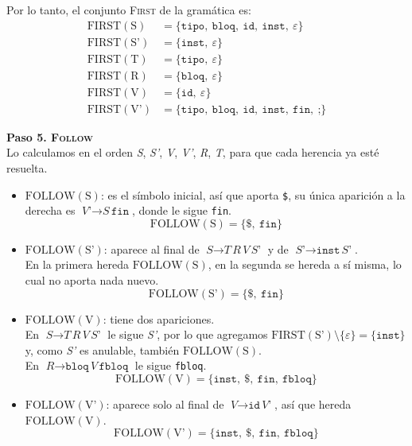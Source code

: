 \documentclass[12pt,letterpaper]{article}
\newcommand{\nt}[1]{\textit{#1}}
\newcommand{\tk}[1]{\texttt{#1}}
\newcommand{\tx}[1]{\text{#1}}
\newcommand{\First}[1]{\mathrm{FIRST}(#1)}
\newcommand{\Follow}[1]{\mathrm{FOLLOW}(#1)}
\newcommand{\eps}{\varepsilon}
\begin{document}
\begin{enumerate}[label=\arabic*.]
\begin{itemize}
    Por lo tanto, el conjunto \textsc{First} de la gramática es:
    \[
    \begin{aligned}
      \First{\tx{S}}  &= \{\tk{tipo},\ \tk{bloq},\ \tk{id},\ \tk{inst},\ \eps\} \\
      \First{\tx{S'}} &= \{\tk{inst},\ \eps\} \\
      \First{\tx{T}}  &= \{\tk{tipo},\ \eps\} \\
      \First{\tx{R}}  &= \{\tk{bloq},\ \eps\} \\
      \First{\tx{V}}  &= \{\tk{id},\ \eps\} \\
      \First{\tx{V'}} &= \{\tk{tipo},\ \tk{bloq},\ \tk{id},\ \tk{inst},\ \tk{fin},\ \tk{;}\}
    \end{aligned}
    \]

    \bigskip

    \textbf{Paso 5. \textsc{Follow}}\\
    Lo calculamos en el orden \nt{S}, \nt{S'}, \nt{V}, \nt{V'}, \nt{R}, \nt{T}, para que cada herencia ya
    esté resuelta.
    \begin{itemize}
    \item $\Follow{\tx{S}}$: es el símbolo inicial, así que aporta \tk{\$}, su única aparición a la derecha
      es $\nt{V'}\to\nt{S}\,\tk{fin}$, donde le sigue \tk{fin}.
      \[
      \Follow{\tx{S}} = \{\tk{\$},\ \tk{fin}\}
      \]

    \item $\Follow{\tx{S'}}$: aparece al final de $\nt{S}\to\nt{T}\,\nt{R}\,\nt{V}\,\nt{S'}$ y de
      $\nt{S'}\to\tk{inst}\,\nt{S'}$.\\
      En la primera hereda $\Follow{\tx{S}}$, en la segunda se hereda a sí misma, lo cual no aporta nada nuevo.
      \[
      \Follow{\tx{S'}} = \{\tk{\$},\ \tk{fin}\}
      \]

    \item $\Follow{\tx{V}}$: tiene dos apariciones.\\
      En $\nt{S}\to\nt{T}\,\nt{R}\,\nt{V}\,\nt{S'}$ le sigue \nt{S'}, por lo que agregamos
      $\First{\tx{S'}}\setminus\{\eps\}=\{\tk{inst}\}$ y, como \nt{S'} es anulable, también $\Follow{\tx{S}}$.\\
      En $\nt{R}\to\tk{bloq}\,\nt{V}\,\tk{fbloq}$ le sigue \tk{fbloq}.
      \[
      \Follow{\tx{V}} = \{\tk{inst},\ \tk{\$},\ \tk{fin},\ \tk{fbloq}\}
      \]

    \item $\Follow{\tx{V'}}$: aparece solo al final de $\nt{V}\to\tk{id}\,\nt{V'}$, así que hereda
      $\Follow{\tx{V}}$.
      \[
      \Follow{\tx{V'}} = \{\tk{inst},\ \tk{\$},\ \tk{fin},\ \tk{fbloq}\}
      \]


\end{itemize}
\end{itemize}
\end{enumerate}
\end{document}
